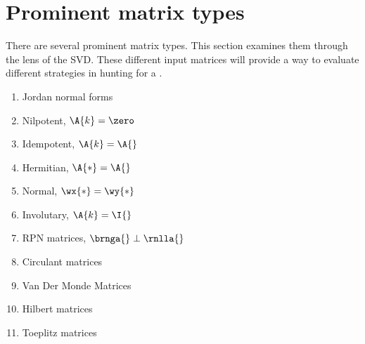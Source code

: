 \section{Prominent matrix types}
There are several prominent matrix types. This section examines them through the lens of the SVD. These different input matrices will provide a way to evaluate different strategies in hunting for a \asvd.

\begin{enumerate}
%
  \item Jordan normal forms
%
  \item Nilpotent, $\A{k} = \zero$
%
  \item Idempotent, $\A{k} = \A{}$
%
  \item Hermitian, $\A{*} = \A{}$
%
  \item Normal, $\wx{*} = \wy{*}$
%
  \item Involutary, $\A{k} = \I{}$
%
  \item RPN matrices, $\brnga{} \perp \rnlla{}$
%
  \item Circulant matrices
%
  \item Van Der Monde Matrices
%
  \item Hilbert matrices
%
  \item Toeplitz matrices
%
\end{enumerate}






\endinput